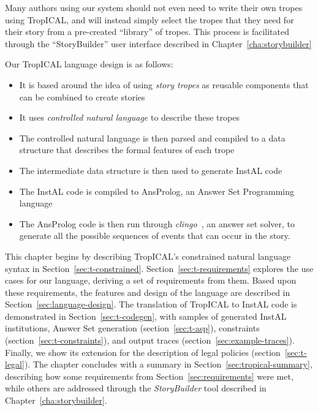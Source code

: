\documentclass[11pt]{report}
\begin{document}
Many authors using our system should not even need to
write their own tropes using TropICAL, and will instead simply select the tropes
that they need for their story from a pre-created ``library'' of tropes. This
process is facilitated through the ``StoryBuilder'' user interface described in
Chapter~\ref{cha:storybuilder}

Our TropICAL language design is as follows:

\begin{itemize}
  \item It is based around the idea of using \emph{story tropes} as reusable
    components that can be combined to create stories
  \item It uses \emph{controlled natural language} to describe these tropes
  \item The controlled natural language is then parsed and compiled to a data
    structure that describes the formal features of each trope
  \item The intermediate data structure is then used to generate InstAL code
  \item The InstAL code is compiled to AnsProlog, an Answer Set Programming
    language
  \item The AnsProlog code is then run through
    \emph{clingo}~\citep{gebser2011potassco}, an answer set solver, to generate
    all the possible sequences of events that can occur in the story.
\end{itemize}

This chapter begins by describing TropICAL's constrained natural
language syntax in Section~\ref{sec:t-constrained}.
Section~\ref{sec:t-requirements} explores the use cases for our language, deriving
a set of requirements from them. Based upon these requirements, the features and
design of the language are described in Section~\ref{sec:language-design}.
The translation of TropICAL to InstAL code is demonstrated in Section~\ref{sec:t-codegen}, with samples of generated InstAL
institutions, Answer Set
generation (section~\ref{sec:t-asp}), constraints
(section~\ref{sec:t-constraints}), and output traces (section~\ref{sec:example-traces}). Finally, we show its extension for
the description of legal policies (section~\ref{sec:t-legal}). The chapter
concludes with a summary in Section~\ref{sec:tropical-summary}, describing how
some requirements from Section~\ref{sec:requirements} were met, while others are
addressed through the \emph{StoryBuilder} tool described in Chapter~\ref{cha:storybuilder}.
\end{document}
